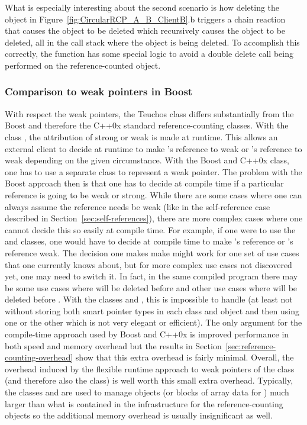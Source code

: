 \documentclass[pdf,ps2pdf,11pt]{SANDreport}
\begin{document}
What is especially interesting about the second scenario is how
deleting the {} object in
Figure~\ref{fig:CircularRCP_A_B_ClientB}.b triggers a chain reaction
that causes the {} object to be deleted which recursively
causes the {} object to be deleted, all in the call stack
where the {} object is being deleted.  To accomplish this
correctly, the {} function has some
special logic to avoid a double delete call being performed on the
reference-counted object.


%
{}\subsubsection*{Comparison to weak pointers in Boost}
%

With respect the weak pointers, the Teuchos class {} differs
substantially from the Boost and therefore the C++0x standard
reference-counting classes.  With the class {}, the
attribution of strong or weak is made at runtime.  This allows an
external client to decide at runtime to make {}'s reference to
{} weak or {}'s reference to {} weak depending on
the given circumstance.  With the Boost and C++0x {}
class, one has to use a separate class {} to represent
a weak pointer.  The problem with the Boost approach then is that one
has to decide at compile time if a particular reference is going to be
weak or strong.  While there are some cases where one can always
assume the reference needs be weak (like in the self-reference case
described in Section~\ref{sec:self-references}), there are more
complex cases where one cannot decide this so easily at compile time.
For example, if one were to use the {} and
{} classes, one would have to decide at compile time to
make {}'s reference or {}'s reference weak.  The
decision one makes make might work for one set of use cases that one
currently knows about, but for more complex use cases not discovered
yet, one may need to switch it.  In fact, in the same compiled program
there may be some use cases where {} will be deleted before
{} and other use cases where {} will be deleted before
{}.  With the classes {} and
{}, this is impossible to handle (at least not without
storing both smart pointer types in each class {} and {}
object and then using one or the other which is not very elegant or
efficient).  The only argument for the compile-time approach used by
Boost and C++0x is improved performance in both speed and memory
overhead but the results in
Section~\ref{sec:reference-counting-overhead} show that this extra
overhead is fairly minimal.  Overall, the overhead induced by the
flexible runtime approach to weak pointers of the {} class
(and therefore also the {} class) is well worth this
small extra overhead.  Typically, the classes {} and
{} are used to manage objects (or blocks of array data
for {}) much larger than what is contained in the
infrastructure for the reference-counting objects so the additional
memory overhead is usually insignificant as well.
\end{document}
